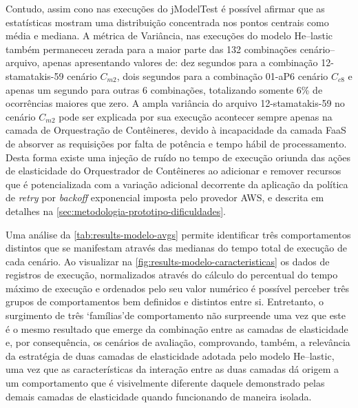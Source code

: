 \documentclass[english,brazilian]{UNISINOSmonografia} %
\begin{document}
Contudo, assim cono nas execuções do jModelTest é possível afirmar que as estatísticas mostram uma distribuição concentrada nos pontos centrais como média e mediana.
%
A métrica de Variância, nas execuções do modelo \textsf{He}--lastic também permaneceu zerada para a maior parte das 132 combinações cenário--arquivo, apenas apresentando valores de: dez segundos para a combinação 12-stamatakis-59 cenário $C_{m2}$, dois segundos para a combinação 01-aP6 cenário $C_{c8}$ e apenas um segundo para outras 6 combinações, totalizando somente 6\% de ocorrências maiores que zero.
%
A ampla variância do arquivo 12-stamatakis-59 no cenário $C_{m2}$ pode ser explicada por sua execução acontecer sempre apenas na camada de Orquestração de Contêineres, devido à incapacidade da camada FaaS de absorver as requisições por falta de potência e tempo hábil de processamento.
%
Desta forma existe uma injeção de ruído no tempo de execução oriunda das ações de elasticidade do Orquestrador de Contêineres ao adicionar e remover recursos que é potencializada com a variação adicional decorrente da aplicação da política de \textit{retry} por \textit{backoff} exponencial imposta pelo provedor AWS, e descrita em detalhes na \autoref{sec:metodologia-prototipo-dificuldades}. 


Uma análise da \autoref{tab:results-modelo-avgs} permite identificar três comportamentos distintos que se manifestam através das medianas do tempo total de execução de cada cenário.
%
Ao visualizar na \autoref{fig:results-modelo-caracteristicas} os dados de registros de execução, normalizados através do cálculo do percentual do tempo máximo de execução e ordenados pelo seu valor numérico é possível perceber três grupos de comportamentos bem definidos e distintos entre si.
%
Entretanto, o surgimento de três \textquoteleft famílias\textquoteright de comportamento não surpreende uma vez que este é o mesmo resultado que emerge da combinação entre as camadas de elasticidade e, por consequência, os cenários de avaliação, comprovando, também, a relevância da estratégia de duas camadas de elasticidade adotada pelo modelo \textsf{He}--lastic, uma vez que as características da interação entre as duas camadas dá origem a um comportamento que é visivelmente diferente daquele demonstrado pelas demais camadas de elasticidade quando funcionando de maneira isolada.
\end{document}
